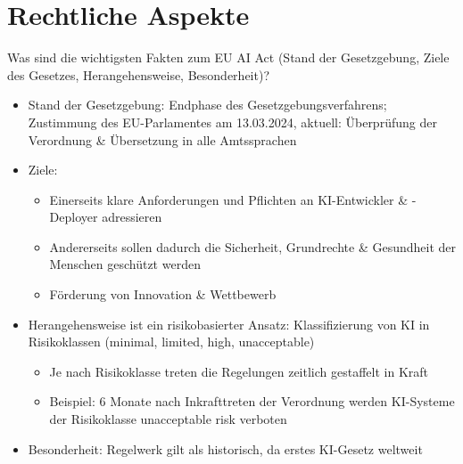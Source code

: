 \documentclass[12pt,ngerman]{AssignmentClass}
\begin{document}
    
    \section{Rechtliche Aspekte}
        Was sind die wichtigsten Fakten zum EU AI Act (Stand der Gesetzgebung, Ziele des Gesetzes, Herangehensweise, Besonderheit)? 
        \begin{itemize}
            \item Stand der Gesetzgebung: Endphase des Gesetzgebungsverfahrens; Zustimmung des EU-Parlamentes am 13.03.2024, aktuell:  Überprüfung der Verordnung \& Übersetzung in alle Amtssprachen
            \item Ziele:
            \begin{itemize}
                \item Einerseits klare Anforderungen und Pflichten an KI-Entwickler \& -Deployer adressieren
                \item Andererseits sollen dadurch die Sicherheit, Grundrechte \& Gesundheit der Menschen geschützt werden
                \item Förderung von Innovation \& Wettbewerb
            \end{itemize}
            \item Herangehensweise ist ein risikobasierter Ansatz: Klassifizierung von KI in Risikoklassen (minimal, limited, high, unacceptable)
            \begin{itemize}
                \item Je nach Risikoklasse treten die Regelungen zeitlich gestaffelt in Kraft
                \item Beispiel: 6 Monate nach Inkrafttreten der Verordnung werden KI-Systeme der Risikoklasse unacceptable risk verboten
            \end{itemize}
            \item Besonderheit: Regelwerk gilt als historisch, da erstes KI-Gesetz weltweit
        \end{itemize}

    
\end{document}
